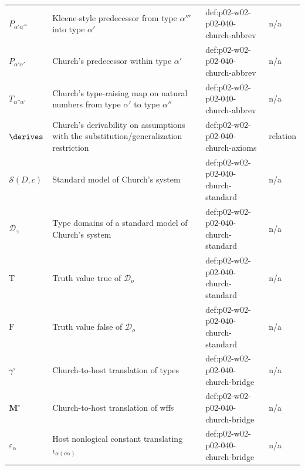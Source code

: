 \begin{longtable}{@{}p{}p{}p{}p{}@{}}
\(P_{\alpha'\alpha'''}\) & Kleene-style predecessor from type \(\alpha'''\) into type \(\alpha'\) & def:\allowbreak{}p02-\allowbreak{}w02-\allowbreak{}p02-\allowbreak{}040-\allowbreak{}church-\allowbreak{}abbrev & n/a \\
\(P_{\alpha'\alpha'}\) & Church's predecessor within type \(\alpha'\) & def:\allowbreak{}p02-\allowbreak{}w02-\allowbreak{}p02-\allowbreak{}040-\allowbreak{}church-\allowbreak{}abbrev & n/a \\
\(T_{\alpha''\alpha'}\) & Church's type-raising map on natural numbers from type \(\alpha'\) to type \(\alpha''\) & def:\allowbreak{}p02-\allowbreak{}w02-\allowbreak{}p02-\allowbreak{}040-\allowbreak{}church-\allowbreak{}abbrev & n/a \\
\(\derives\) & Church's derivability on assumptions with the substitution/generalization restriction & def:\allowbreak{}p02-\allowbreak{}w02-\allowbreak{}p02-\allowbreak{}040-\allowbreak{}church-\allowbreak{}axioms & relation \\
\(\mathcal S(D,\allowbreak c)\) & Standard model of Church's system & def:\allowbreak{}p02-\allowbreak{}w02-\allowbreak{}p02-\allowbreak{}040-\allowbreak{}church-\allowbreak{}standard & n/a \\
\(\mathcal D_\gamma\) & Type domains of a standard model of Church's system & def:\allowbreak{}p02-\allowbreak{}w02-\allowbreak{}p02-\allowbreak{}040-\allowbreak{}church-\allowbreak{}standard & n/a \\
\(\mathrm T\) & Truth value true of \(\mathcal D_o\) & def:\allowbreak{}p02-\allowbreak{}w02-\allowbreak{}p02-\allowbreak{}040-\allowbreak{}church-\allowbreak{}standard & n/a \\
\(\mathrm F\) & Truth value false of \(\mathcal D_o\) & def:\allowbreak{}p02-\allowbreak{}w02-\allowbreak{}p02-\allowbreak{}040-\allowbreak{}church-\allowbreak{}standard & n/a \\
\(\gamma^\circ\) & Church-to-host translation of types & def:\allowbreak{}p02-\allowbreak{}w02-\allowbreak{}p02-\allowbreak{}040-\allowbreak{}church-\allowbreak{}bridge & n/a \\
\(\mathbf M^\circ\) & Church-to-host translation of wffs & def:\allowbreak{}p02-\allowbreak{}w02-\allowbreak{}p02-\allowbreak{}040-\allowbreak{}church-\allowbreak{}bridge & n/a \\
\(\varepsilon_\alpha\) & Host nonlogical constant translating \(\iota_{\alpha(o\alpha)}\) & def:\allowbreak{}p02-\allowbreak{}w02-\allowbreak{}p02-\allowbreak{}040-\allowbreak{}church-\allowbreak{}bridge & n/a \\

\end{longtable}
